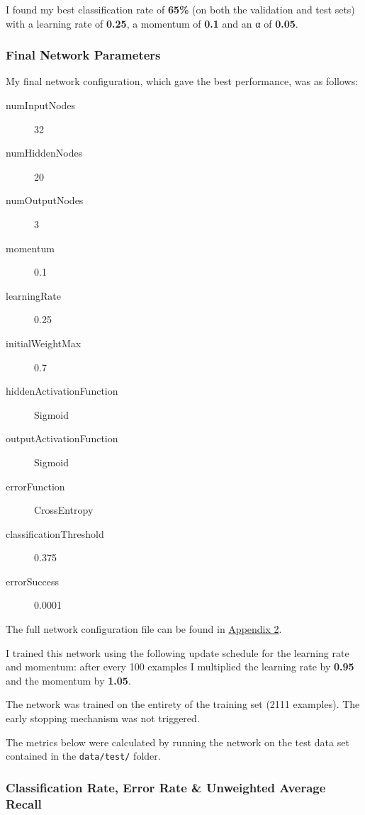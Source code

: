 \documentclass[a4paper]{article}
\begin{document}
I found my best classification rate of \textbf{65\%} (on both the validation and test sets) with a learning rate of \textbf{0.25}, a momentum of \textbf{0.1} and an α of \textbf{0.05}.

\subsubsection{Final Network Parameters}%
\label{subsubsec:ev_cp_networkparameters}

My final network configuration, which gave the best performance, was as follows:

\begin{description}
\item[numInputNodes] 32
\item[numHiddenNodes] 20
\item[numOutputNodes] 3
\item[momentum] 0.1
\item[learningRate] 0.25
\item[initialWeightMax] 0.7
\item[hiddenActivationFunction] Sigmoid
\item[outputActivationFunction] Sigmoid
\item[errorFunction] CrossEntropy
\item[classificationThreshold] 0.375
\item[errorSuccess] 0.0001
\end{description}

The full network configuration file can be found in \hyperref[subsec:a2_finalconfig]{Appendix 2}.

I trained this network using the following update schedule for the learning rate and momentum: after every 100 examples I multiplied the learning rate by \textbf{0.95} and the momentum by \textbf{1.05}.

The network was trained on the entirety of the training set (2111 examples). The early stopping mechanism was not triggered.

The metrics below were calculated by running the network on the test data set contained in the \lstinline{data/test/} folder.

\subsubsection{Classification Rate, Error Rate \& Unweighted Average Recall}
\label{subsubsec:ev_cp_classificationrate}
\end{document}
